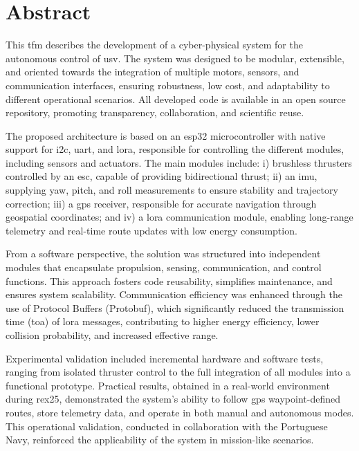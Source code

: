 
\chapter{Abstract}

This \acrfull{tfm} describes the development of a cyber-physical system for the autonomous control of \acrfull{usv}. The system was designed to be modular, extensible, and oriented towards the integration of multiple motors, sensors, and communication interfaces, ensuring robustness, low cost, and adaptability to different operational scenarios. All developed code is available in an open source repository, promoting transparency, collaboration, and scientific reuse.

The proposed architecture is based on an \acrfull{esp32} microcontroller with native support for \acrfull{i2c}, \acrfull{uart}, and \acrfull{lora}, responsible for controlling the different modules, including sensors and actuators. The main modules include: i) brushless thrusters controlled by an \acrfull{esc}, capable of providing bidirectional thrust; ii) an \acrfull{imu}, supplying yaw, pitch, and roll measurements to ensure stability and trajectory correction; iii) a \acrfull{gps} receiver, responsible for accurate navigation through geospatial coordinates; and iv) a \acrfull{lora} communication module, enabling long-range telemetry and real-time route updates with low energy consumption.

From a software perspective, the solution was structured into independent modules that encapsulate propulsion, sensing, communication, and control functions. This approach fosters code reusability, simplifies maintenance, and ensures system scalability. Communication efficiency was enhanced through the use of Protocol Buffers (Protobuf), which significantly reduced the transmission time (\acrfull{toa}) of \acrfull{lora} messages, contributing to higher energy efficiency, lower collision probability, and increased effective range.

Experimental validation included incremental hardware and software tests, ranging from isolated thruster control to the full integration of all modules into a functional prototype. Practical results, obtained in a real-world environment during \acrfull{rex25}, demonstrated the system's ability to follow \acrfull{gps} waypoint-defined routes, store telemetry data, and operate in both manual and autonomous modes. This operational validation, conducted in collaboration with the Portuguese Navy, reinforced the applicability of the system in mission-like scenarios.

